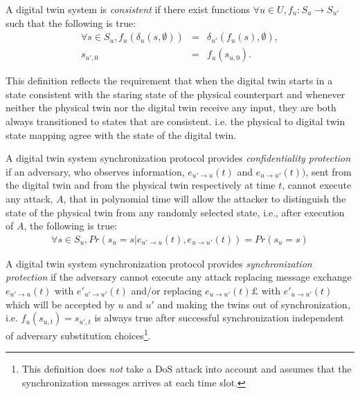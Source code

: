 \label{dtwinsecurity:defintions}
\theoremstyle{definition}
\begin{definition}
\label{dtwinsecurity:consistent}
A digital twin system is \emph{consistent} if there exist functions $\forall u \in U,f_u: S_u\rightarrow S_{u'}$such that the following is true:
\begin{eqnarray}
    \forall s \in S_u, f_u(\delta_u (s,\emptyset))  & =  &\delta_{u'}(f_u(s),\emptyset),\label{dtwinsecurity:const1}\\
	s_{u',0} & = &f_u(s_{u,0}). \label{dtwinsecurity:const2}
\end{eqnarray}
\end{definition}

This definition reflects the requirement that when the digital twin starts in a state consistent with the staring state of the physical counterpart and whenever neither the physical twin nor the digital twin receive any input, they are both always transitioned to states that are consistent. i.e. the physical to digital twin state mapping agree with the state of the digital twin.

\begin{definition}
\label{dtwinsecurity:confidentiality}
A digital twin system synchronization protocol provides \emph{confidentiality protection} if an adversary, who observes information, $e_{u'\rightarrow u}(t)$ and $e_{u\rightarrow u'}(t))$, sent from the digital twin and from the physical twin respectively at time $t$,  cannot execute any attack, $A$, that in polynomial time will allow the attacker to distinguish the state of the physical twin from any randomly selected state, i.e., after execution of $A$, the following is true: 
\begin{eqnarray}
    \forall s \in S_u,  Pr(s_u = s|e_{u'\rightarrow u}(t), e_{u\rightarrow u'}(t)) = Pr(s_u = s) \label{dtwinsecurity:eqconfidentiality}
\end{eqnarray}
\end{definition}

\begin{definition}
\label{dtwinsecurity:synchprot}
A digital twin system synchronization protocol provides \emph{synchronization protection} if the adversary cannot execute any attack replacing message exchange $e_{u'\rightarrow u}(t)$ with $e'_{u'\rightarrow u'}(t)$ and/or replacing $e_{u\rightarrow u'}(t)£$ with $e'_{u\rightarrow u'}(t)$ which will be accepted by $u$ and $u'$ and making the twins out of synchronization, i.e.  $f_u(s_{u,t}) = s_{u',t}$ is always true after successful synchronization independent of adversary substitution choices\footnote{This definition does {\it not} take a DoS attack into account and assumes that the synchronization messages arrives at each time slot.}.
\end{definition}


